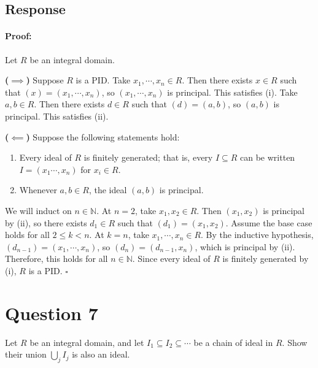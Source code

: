 \documentclass [12pt] {article}
\newcommand{\N}{\mathbb{N}}
\newenvironment{proof}{\paragraph{Proof:}}{\hfill$\square$}
\begin{document}
\subsection*{Response}
\begin{proof}
    Let $R$ be an integral domain.
    \vspace{0.5em}

    \textbf{($\bm{\implies}$)}
    Suppose $R$ is a PID. Take $x_1, \cdots, x_n \in R$. Then there exists $x \in R$ such that
    $(x) = (x_1, \cdots, x_n)$, so $(x_1, \cdots, x_n)$ is principal. This satisfies (i).
    Take $a, b \in R$. Then there exists $d \in R$ such that $(d) = (a, b)$, so $(a, b)$ is
    principal. This satisfies (ii).
    \vspace{0.5em}

    \textbf{($\bm{\impliedby}$)}
    Suppose the following statements hold:
    \begin{enumerate}[label=(\roman*)]
        \item Every ideal of $R$ is finitely generated; that is, every $I \subseteq R$ can be
            written $I = (x_1 \cdots, x_n)$ for $x_i \in R$.
        \item Whenever $a, b \in R$, the ideal $(a, b)$ is principal.
    \end{enumerate}
    We will induct on $n \in \N$. At $n = 2$, take $x_1, x_2 \in R$. Then $(x_1, x_2)$ is principal
    by (ii), so there exists $d_1 \in R$ such that $(d_1) = (x_1, x_2)$. Assume the base case holds
    for all $2 \leq k < n$. At $k = n$, take $x_1, \cdots, x_n \in R$. By the inductive hypothesis,
    $(d_{n - 1}) = (x_1, \cdots, x_n)$, so $(d_n) = (d_{n - 1}, x_n)$, which is principal by (ii).
    Therefore, this holds for all $n \in \N$. Since every ideal of $R$ is finitely generated by (i),
    $R$ is a PID.
\end{proof}
\newpage

\section*{Question 7}
Let $R$ be an integral domain, and let $I_1\subseteq I_2\subseteq\cdots$ be a chain of ideal in $R$.
Show their union $\bigcup_j I_j$ is also an ideal.
\end{document}
